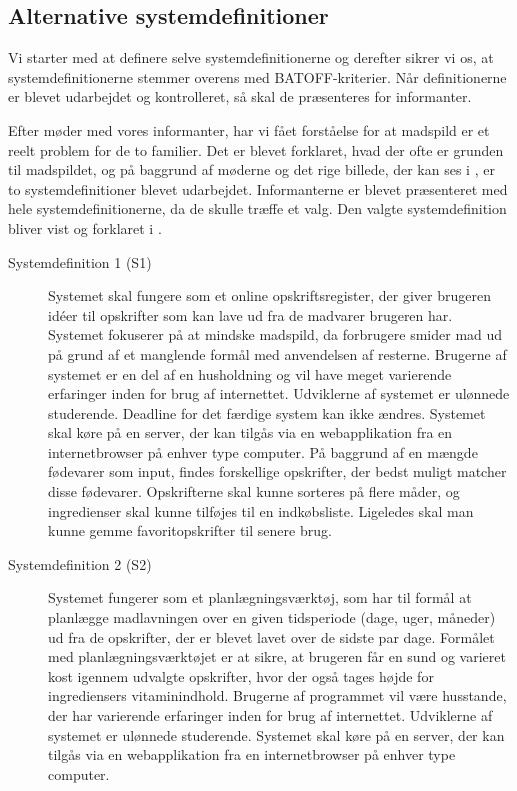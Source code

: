 \subsection{Alternative systemdefinitioner}
\label{subsec:alternativesystemdefinitioner}

Vi starter med at definere selve systemdefinitionerne og derefter sikrer vi os, at systemdefinitionerne stemmer overens med BATOFF-kriterier. Når definitionerne er blevet udarbejdet og kontrolleret, så skal de præsenteres for informanter. 

Efter møder med vores informanter, har vi fået forståelse for at madspild er et reelt problem for de to familier. Det er blevet forklaret, hvad der ofte er grunden til madspildet, og på baggrund af møderne og det rige billede, der kan ses i , er to systemdefinitioner blevet udarbejdet. Informanterne er blevet præsenteret med hele systemdefinitionerne, da de skulle træffe et valg. Den valgte systemdefinition bliver vist og forklaret i .

\begin{description}
\item[Systemdefinition 1 (S1)] 
Systemet skal fungere som et online opskriftsregister, der giver brugeren idéer til opskrifter som kan lave ud fra de madvarer brugeren har. Systemet fokuserer på at mindske madspild, da forbrugere smider mad ud på grund af et manglende formål med anvendelsen af resterne. Brugerne af systemet er en del af en husholdning og vil have meget varierende erfaringer inden for brug af internettet. Udviklerne af systemet er ulønnede studerende. Deadline for det færdige system kan ikke ændres. Systemet skal køre på en server, der kan tilgås via en webapplikation fra en internetbrowser på enhver type computer. På baggrund af en mængde fødevarer som input, findes forskellige opskrifter, der bedst muligt matcher disse fødevarer. Opskrifterne skal kunne sorteres på flere måder, og ingredienser skal kunne tilføjes til en indkøbsliste. Ligeledes skal man kunne gemme favoritopskrifter til senere brug.
\item[Systemdefinition 2 (S2)] 
Systemet fungerer som et planlægningsværktøj, som har til formål at planlægge madlavningen over en given tidsperiode (\fx dage, uger, måneder) ud fra de opskrifter, der er blevet lavet over de sidste par dage. Formålet med planlægningsværktøjet er at sikre, at brugeren får en sund og varieret kost igennem udvalgte opskrifter, hvor der også tages højde for ingrediensers vitaminindhold. Brugerne af programmet vil være husstande, der har varierende erfaringer inden for brug af internettet. Udviklerne af systemet er ulønnede studerende. Systemet skal køre på en server, der kan tilgås via en webapplikation fra en internetbrowser på enhver type computer.
\end{description}

